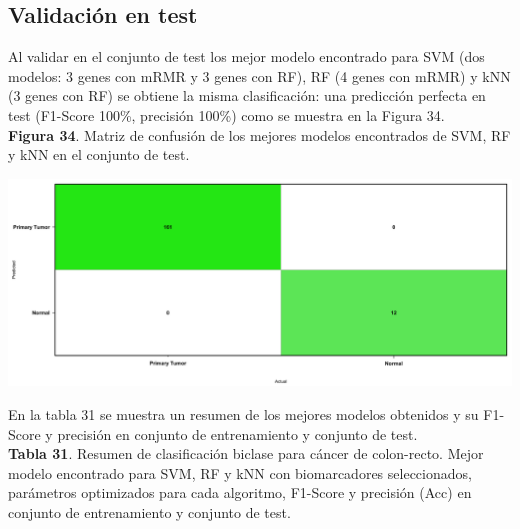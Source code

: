 \subsection{Validación en test}

Al validar en el conjunto de test los mejor modelo encontrado para SVM (dos modelos: 3 genes con mRMR y 3 genes con RF), RF (4 genes con mRMR) y kNN (3 genes con RF) se obtiene la misma clasificación: una predicción perfecta en test (F1-Score 100\%, precisión 100\%) como se muestra en la Figura 34.\\

\textbf{Figura 34}. Matriz de confusión de los mejores modelos encontrados de SVM, RF y kNN en el conjunto de test.

\begin{center}
	\includegraphics[width=1\textwidth]{figuras/34_cr_biclase_18_svm_matriz_confusion_mejor_metodo.png} 
\end{center}

En la tabla 31 se muestra un resumen de los mejores modelos obtenidos y su F1-Score y precisión en conjunto de entrenamiento y conjunto de test.\\

\textbf{Tabla 31}. Resumen de clasificación biclase para cáncer de colon-recto. Mejor modelo encontrado para SVM, RF y kNN con biomarcadores seleccionados, parámetros optimizados para cada algoritmo, F1-Score y precisión (Acc) en conjunto de entrenamiento y conjunto de test.

